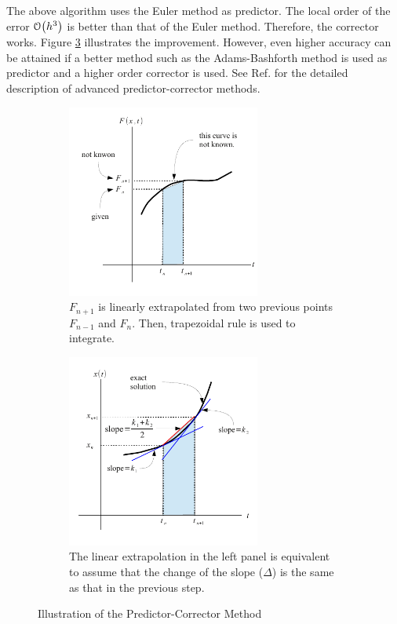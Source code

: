 \bigskip
The above algorithm uses the Euler method as predictor. The local order of the error $\order{h^3}$ is better than that of the Euler method. Therefore, the corrector works.   Figure \ref{fig:predict-correct} illustrates the improvement. However, even higher accuracy can be attained if a better method such as the Adams-Bashforth method is used as predictor and a higher order corrector is used. See Ref. \cite{numerical_recipes} for the detailed description of advanced predictor-corrector methods.


\begin{figure}
	\begin{subfigure}{0.45\textwidth}
		\centering
		\includegraphics[height=2.5in]{05.ode1/predict-correct-integral.pdf}
\caption{$F_{n+1}$ is linearly extrapolated from two previous points $F_{n-1}$ and $F_n$.  Then, trapezoidal rule is used to integrate.}
\label{fig:predict-correct-integral}
	\end{subfigure}
	\begin{subfigure}{0.45\textwidth}
		\centering 
		\includegraphics[height=2.5in]{05.ode1/predict-correct-x.pdf}
\caption{The linear extrapolation in the left panel is equivalent to assume that the change of the slope ($\Delta$) is the same as that in the previous step.}
\label{fig:predict-correct-rule}
	\end{subfigure}
\caption{Illustration of the Predictor-Corrector Method}\label{fig:predict-correct}
\end{figure}

